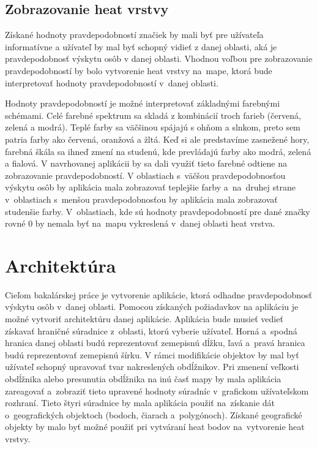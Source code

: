 \subsection{Zobrazovanie heat vrstvy}
Získané hodnoty pravdepodobností značiek by mali byť pre užívateľa informatívne a užívateľ by mal byť schopný vidieť z danej oblasti, aká je pravdepodobnosť výskytu osôb v danej oblasti. Vhodnou voľbou pre zobrazovanie pravdepodobností by bolo vytvorenie heat vrstvy na~mape, ktorá bude interpretovať hodnoty pravdepodobností v~danej oblasti.

Hodnoty pravdepodobností je možné interpretovať základnými farebnými schémami. Celé farebné spektrum sa skladá z kombinácií troch farieb (červená, zelená a modrá). Teplé farby sa väčšinou spájajú s ohňom a slnkom, preto sem patria farby ako červená, oranžová a žltá. Keď si ale predstavíme zasnežené hory, farebná škála sa ihneď zmení na studenú, kde prevládajú farby ako modrá, zelená a fialová. V navrhovanej aplikácii by sa dali využiť tieto farebné odtiene na zobrazovanie pravdepodobností. V oblastiach s~väčšou pravdepodobnosťou výskytu osôb by aplikácia mala zobrazovať teplejšie farby a~na~druhej strane v~oblastiach s~menšou pravdepodobnosťou by aplikácia mala zobrazovať studenšie farby. V~oblastiach, kde sú hodnoty pravdepodobností pre dané značky rovné $0$ by nemala byť na~mapu vykreslená v~danej oblasti heat vrstva.


\section{Architektúra}
Cieľom bakalárskej práce je vytvorenie aplikácie, ktorá odhadne pravdepodobnosť výskytu osôb v~danej oblasti. Pomocou získaných požiadavkov na aplikáciu je možné vytvoriť architektúru danej aplikácie. Aplikácia bude musieť vedieť získavať hraničné súradnice z~oblasti, ktorú vyberie užívateľ. Horná a~spodná hranica  danej oblasti budú reprezentovať zemepisnú dĺžku, ľavá a~pravá hranica budú reprezentovať zemepisnú šírku. V rámci modifikácie objektov by mal byť užívateľ schopný upravovať tvar nakreslených obdĺžnikov. Pri zmenení veľkosti obdĺžnika alebo presunutia obdĺžnika na inú časť mapy by mala aplikácia zareagovať a~zobraziť tieto upravené hodnoty súradníc v~grafickom užívateľskom rozhraní. Tieto štyri súradnice by mala aplikácia použiť na~získanie dát o~geografických objektoch (bodoch, čiarach a~polygónoch). Získané geografické objekty by malo byť možné použiť pri vytváraní heat bodov na~vytvorenie heat vrstvy. 


